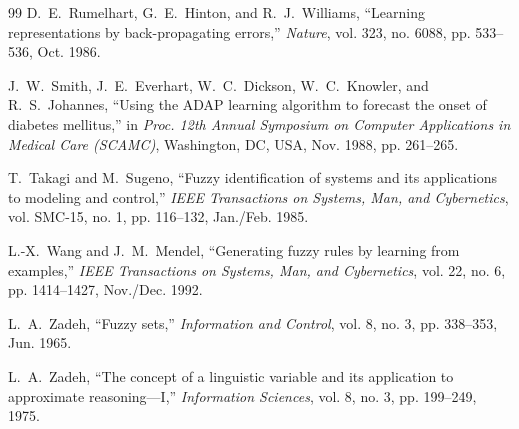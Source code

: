 \documentclass{report}
\begin{document}
\begin{thebibliography}{99}
D.~E.~Rumelhart, G.~E.~Hinton, and R.~J.~Williams, ``Learning representations by back-propagating errors,'' \emph{Nature}, vol. 323, no. 6088, pp. 533--536, Oct. 1986.

J.~W.~Smith, J.~E.~Everhart, W.~C.~Dickson, W.~C.~Knowler, and R.~S.~Johannes, ``Using the ADAP learning algorithm to forecast the onset of diabetes mellitus,'' in \emph{Proc. 12th Annual Symposium on Computer Applications in Medical Care (SCAMC)}, Washington, DC, USA, Nov. 1988, pp. 261--265.

T.~Takagi and M.~Sugeno, ``Fuzzy identification of systems and its applications to modeling and control,'' \emph{IEEE Transactions on Systems, Man, and Cybernetics}, vol. SMC-15, no. 1, pp. 116--132, Jan./Feb. 1985.

L.-X.~Wang and J.~M.~Mendel, ``Generating fuzzy rules by learning from examples,'' \emph{IEEE Transactions on Systems, Man, and Cybernetics}, vol. 22, no. 6, pp. 1414--1427, Nov./Dec. 1992.

L.~A.~Zadeh, ``Fuzzy sets,'' \emph{Information and Control}, vol. 8, no. 3, pp. 338--353, Jun. 1965.

L.~A.~Zadeh, ``The concept of a linguistic variable and its application to approximate reasoning---I,'' \emph{Information Sciences}, vol. 8, no. 3, pp. 199--249, 1975.

\end{thebibliography}
\end{document}
